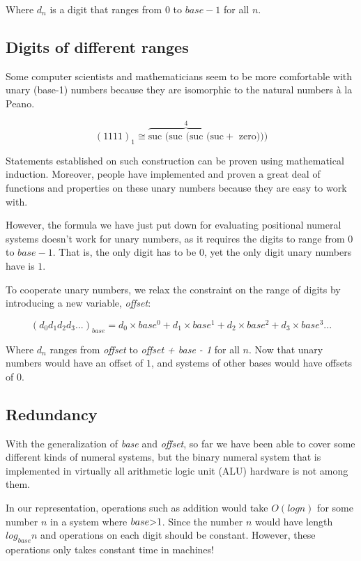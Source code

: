 \documentclass[../thesis.tex]{subfiles}
\begin{document}
Where $ d_{n} $ is a digit that ranges from $ 0 $ to $ base - 1 $ for all $ n $.


\subsection{Digits of different ranges}

Some computer scientists and mathematicians seem to be more comfortable with
unary (base-1) numbers because they are isomorphic to the natural numbers à la Peano.

$$
    (1111)_{1} \cong
        \overbrace{\text{suc (suc (suc (suc}}^4 + \text{ zero)))}
$$

Statements established on such construction can be proven using mathematical
induction. Moreover, people have implemented and proven a great deal of functions
and properties on these unary numbers because they are easy to work with.

However, the formula we have just put down for evaluating positional numeral systems
doesn't work for unary numbers, as it requires the digits to range from $ 0 $ to
$ base - 1 $. That is, the only digit has to be $ 0 $, yet the only digit unary
numbers have is $ 1 $.

To cooperate unary numbers, we relax the constraint on the range of digits
by introducing a new variable, \textit{offset}:

$$
    ({d_0d_1d_2d_3...})_{base}
    =
    d_0\times base^0 + d_1\times base^1 + d_2\times base^2 + d_3\times base^3 ...
$$

Where $ d_{n} $ ranges from \textit{offset} to \textit{offset + base - 1} for
all $ n $. Now that unary numbers would have an offset of $ 1 $,
and systems of other bases would have offsets of $ 0 $.

\subsection{Redundancy}

With the generalization of \textit{base} and \textit{offset}, so far we have been
able to cover some different kinds of numeral systems, but the binary numeral
system that is implemented in virtually all arithmetic logic unit (ALU) hardware
is not among them.

In our representation, operations such as addition would take $ O(log{}n)$ for some
number $ n $ in a system where $ base \text{\textgreater} 1 $. Since the number $ n $
would have length $ log_{base} n $ and operations on each digit should be constant.
However, these operations only takes constant time in machines!
\end{document}
